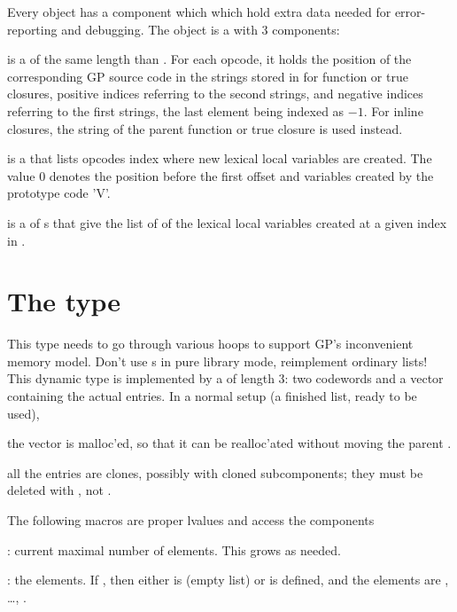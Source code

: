 \label{se:dbgclosure}

Every  object  has a component 
which which hold extra data needed for error-reporting and debugging.
The object  is a  with $3$ components:

 is a  of the same length than . For each
opcode, it holds the position of the corresponding GP source code in the
strings stored in  for function or true closures, positive indices
referring to the second strings, and negative indices referring to the first
strings, the last element being indexed as $-1$. For inline closures, the
string of the parent function or true closure is used instead.

 is a  that lists opcodes index where new lexical
local variables are created. The value $0$ denotes the position before the
first offset and variables created by the prototype code 'V'.

 is a  of s that give the list of
 of the lexical local variables created at a given index in
.

\section{The type } This type needs to go
through various hoops to support GP's inconvenient memory model. Don't
use s in pure library mode, reimplement ordinary lists! This
dynamic type is implemented by a  of length 3: two codewords and a
vector containing the actual entries. In a normal setup (a finished list,
ready to be used),

\item the vector is malloc'ed, so that it can be realloc'ated without moving
the parent .

\item all the entries are clones, possibly with cloned subcomponents; they
must be deleted with , not .

The following macros are proper lvalues and access the components

: current maximal number of elements. This grows
as needed.

: the elements. If , then
either  is  (empty list) or  is defined, and
the elements are , \dots, .

